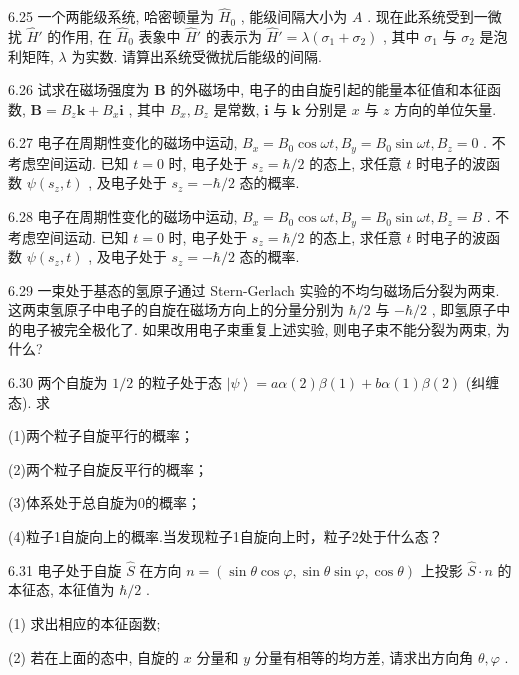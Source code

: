 6.25 一个两能级系统, 哈密顿量为 $\hat{H}_0$ , 能级间隔大小为 $A$ . 现在此系统受到一微扰 $\hat{H}'$ 的作用, 在 $\hat{H}_0$ 表象中 $\hat{H}'$ 的表示为 $\hat{H}' = \lambda (\sigma_1 + \sigma_2)$ , 其中 $\sigma_1$ 与 $\sigma_2$ 是泡利矩阵, $\lambda$ 为实数. 请算出系统受微扰后能级的间隔.

\vfill\newpage

6.26 试求在磁场强度为 $\pmb{B}$ 的外磁场中, 电子的由自旋引起的能量本征值和本征函数, $\pmb{B} = B_{z}\pmb{k} + B_{x}\pmb{i}$ , 其中 $B_{x}, B_{z}$ 是常数, $\pmb{i}$ 与 $\pmb{k}$ 分别是 $x$ 与 $z$ 方向的单位矢量.

\vfill\newpage

6.27 电子在周期性变化的磁场中运动, $B_{x} = B_{0}\cos \omega t, B_{y} = B_{0}\sin \omega t, B_{z} = 0$ . 不考虑空间运动. 已知 $t = 0$ 时, 电子处于 $s_{z} = \hbar / 2$ 的态上, 求任意 $t$ 时电子的波函数 $\psi(s_{z}, t)$ , 及电子处于 $s_{z} = -\hbar / 2$ 态的概率.

\vfill\newpage

6.28 电子在周期性变化的磁场中运动, $B_{x} = B_{0}\cos \omega t, B_{y} = B_{0}\sin \omega t, B_{z} = B$ . 不考虑空间运动. 已知 $t = 0$ 时, 电子处于 $s_{z} = \hbar / 2$ 的态上, 求任意 $t$ 时电子的波函数 $\psi(s_{z}, t)$ , 及电子处于 $s_{z} = -\hbar / 2$ 态的概率.

\vfill\newpage

6.29 一束处于基态的氢原子通过 Stern-Gerlach 实验的不均匀磁场后分裂为两束. 这两束氢原子中电子的自旋在磁场方向上的分量分别为 $\hbar / 2$ 与 $-\hbar / 2$ , 即氢原子中的电子被完全极化了. 如果改用电子束重复上述实验, 则电子束不能分裂为两束, 为什么?

\vfill\newpage

6.30 两个自旋为 $1/2$ 的粒子处于态 $\left|\psi\right\rangle = a\alpha(2)\beta(1) + b\alpha(1)\beta(2)$ (纠缠态). 求

(1)两个粒子自旋平行的概率；

(2)两个粒子自旋反平行的概率；

(3)体系处于总自旋为0的概率；

(4)粒子1自旋向上的概率.当发现粒子1自旋向上时，粒子2处于什么态？

\vfill\newpage

6.31 电子处于自旋 $\hat{S}$ 在方向 $n = (\sin \theta \cos \varphi, \sin \theta \sin \varphi, \cos \theta)$ 上投影 $\hat{S} \cdot n$ 的本征态, 本征值为 $\hbar / 2$ . 

(1) 求出相应的本征函数; 

(2) 若在上面的态中, 自旋的 $x$ 分量和 $y$ 分量有相等的均方差, 请求出方向角 $\theta, \varphi$ .

